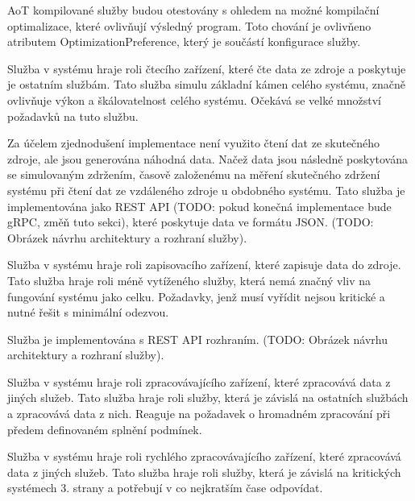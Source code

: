 AoT kompilované služby budou otestovány s ohledem na možné kompilační optimalizace, které ovlivňují výsledný program. Toto chování je ovlivňeno atributem OptimizationPreference, který je součástí konfigurace služby.



Služba v systému hraje roli čtecího zařízení, které čte data ze zdroje a poskytuje je ostatním službám. Tato služba simulu základní kámen celého systému, značně ovlivňuje výkon a škálovatelnost celého systému. Očekává se velké množství požadavků na tuto službu.

Za účelem zjednodušení implementace není využito čtení dat ze skutečného zdroje, ale jsou generována náhodná data. Načež data jsou následně poskytována se simulovaným zdržením, časově založenému na měření skutečného zdržení systému při čtení dat ze vzdáleného zdroje u obdobného systému. Tato služba je implementována jako REST API (TODO: pokud konečná implementace bude gRPC, změň tuto sekci), které poskytuje data ve formátu JSON. (TODO: Obrázek návrhu architektury a rozhraní služby).


Služba v systému hraje roli zapisovacího zařízení, které zapisuje data do zdroje. Tato služba hraje roli méně vytíženého služby, která nemá značný vliv na fungování systému jako celku. Požadavky, jenž musí vyřídit nejsou kritické a nutné řešit s minimální odezvou.

Služba je implementována s REST API rozhraním. (TODO: Obrázek návrhu architektury a rozhraní služby).


Služba v systému hraje roli zpracovávajícího zařízení, které zpracovává data z jiných služeb. Tato služba hraje roli služby, která je závislá na ostatních službách a zpracovává data z nich. Reaguje na požadavek o hromadném zpracování při předem definovaném splnění podmínek.


Služba v systému hraje roli rychlého zpracovávajícího zařízení, které zpracovává data z jiných služeb. Tato služba hraje roli služby, která je závislá na kritických systémech 3. strany a potřebují v co nejkratším čase odpovídat.



